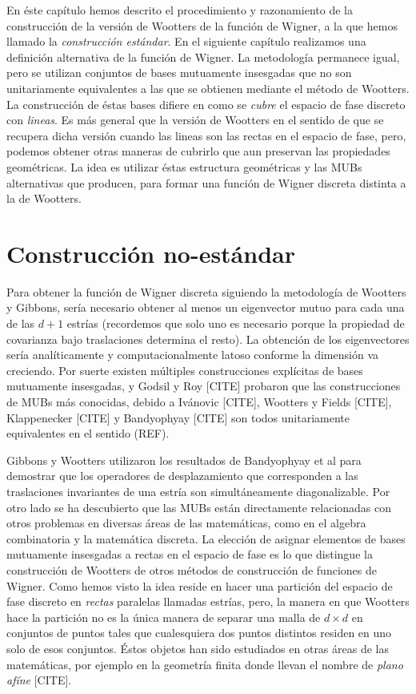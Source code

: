 \documentclass[a4paper]{report}
\begin{document}
  En éste capítulo hemos descrito el procedimiento y
  razonamiento de la construcción de la versión de Wootters
  de la función de Wigner, a la que hemos llamado la
  \textit{construcción estándar}. En el siguiente capítulo
  realizamos una definición alternativa de la función de
  Wigner. La metodología permanece igual, pero se utilizan
  conjuntos de bases mutuamente insesgadas que no son
  unitariamente equivalentes a las que se obtienen mediante
  el método de Wootters. La construcción de éstas bases
  difiere en como se \textit{cubre} el espacio de fase
  discreto con \textit{lineas}. Es más general que la
  versión de Wootters en el sentido de que se recupera dicha
  versión cuando las lineas son las rectas en el espacio de
  fase, pero, podemos obtener otras maneras de cubrirlo que
  aun preservan las propiedades geométricas. La idea es
  utilizar éstas estructura geométricas y las MUBs
  alternativas que producen, para formar una función de
  Wigner discreta distinta a la de Wootters.

  \chapter{Construcción no-estándar}

  Para obtener la función de Wigner discreta
  siguiendo la metodología de Wootters y Gibbons, sería
  necesario obtener al menos un eigenvector mutuo para cada
  una de las $d+1$ estrías (recordemos que solo uno es
  necesario porque la propiedad de covarianza bajo
  traslaciones determina el resto). La obtención de los
  eigenvectores sería analíticamente y computacionalmente
  latoso conforme la dimensión va creciendo. Por suerte
  existen múltiples construcciones explícitas de bases
  mutuamente insesgadas, y Godsil y Roy [CITE] probaron que
  las construcciones de MUBs más conocidas, debido a
  Ivánovic [CITE], Wootters y Fields [CITE], Klappenecker
  [CITE] y Bandyophyay [CITE] son todos unitariamente
  equivalentes en el sentido (REF).

  Gibbons y Wootters utilizaron los resultados de
  Bandyophyay et al para demostrar que los operadores de
  desplazamiento que corresponden a las traslaciones
  invariantes de una estría son simultáneamente
  diagonalizable. Por otro lado se ha descubierto que las
  MUBs están directamente relacionadas con otros problemas
  en diversas áreas de las matemáticas, como en el algebra
  combinatoria y la matemática discreta. La elección de
  asignar elementos de bases mutuamente insesgadas a rectas
  en el espacio de fase es lo que distingue la construcción
  de Wootters de otros métodos de construcción de funciones
  de Wigner. Como hemos visto la idea reside en hacer una
  partición del espacio de fase discreto en \textit{rectas}
  paralelas llamadas estrías, pero, la manera en que
  Wootters hace la partición no es la única manera de
  separar una malla de $d \times d$ en conjuntos de puntos
  tales que cualesquiera dos puntos distintos residen en uno
  solo de esos conjuntos. Éstos objetos han sido estudiados
  en otras áreas de las matemáticas, por ejemplo en la
  geometría finita donde llevan el nombre de \textit{plano
  afíne} [CITE]. 
\end{document}
